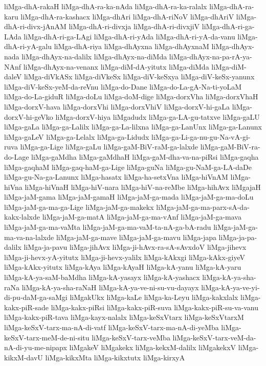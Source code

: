 {liMga-dhA-rakaH
liMga-dhA-ra-ka-nAda
liMga-dhA-ra-ka-ralalx
liMga-dhA-ra-karu
liMga-dhA-ra-kashacx
liMga-dhAri
liMga-dhA-riNoV
liMga-dhAriV
liMga-dhA-ri-divx-jAnAM
liMga-dhA-ri-divxja
liMga-dhA-ri-divxjiV
liMga-dhA-ri-ga-LAda
liMga-dhA-ri-ga-LAgi
liMga-dhA-ri-yAda
liMga-dhA-ri-yA-da-vanu
liMga-dhA-ri-yA-galu
liMga-dhA-riya
liMga-dhAyxna
liMga-dhAyxnaM
liMga-dhAyx-nada
liMga-dhAyx-na-dalilx
liMga-dhAyx-na-diMda
liMga-dhAyx-na-pa-rA-ya-NAnf
liMga-dhAyx-na-venanx
liMga-diM-dA-yitutx
liMga-diMda
liMga-diM-daleV
liMga-diVkASx
liMga-diVkeSx
liMga-diV-keSxya
liMga-diV-keSx-yanunx
liMga-diV-keSx-yeM-da-reVnu
liMga-do-Dane
liMga-do-La-gA-Na-ti-yoLaM
liMga-do-La-giduR
liMga-doLu
liMga-doM-dige
liMga-dorxVha
liMga-dorxVhaH
liMga-dorxV-hava
liMga-dorxVhi
liMga-dorxVhiV
liMga-dorxV-hi-gaLa
liMga-dorxV-hi-geVko
liMga-dorxV-hiya
liMgadudx
liMga-ga-LA-gu-tatxve
liMga-gaLU
liMga-gaLa
liMga-ga-Lalilx
liMga-ga-La-lilxna
liMga-ga-LanUnx
liMga-ga-Lanunx
liMga-gaLeV
liMga-ga-Lelalx
liMga-ga-Lidudx
liMga-ga-Li-ga-nu-gu-Na-vA-gi-ruva
liMga-ga-Lige
liMga-gaLu
liMga-gaM-BiV-raM-ga-lalxde
liMga-gaM-BiV-ra-do-Lage
liMga-gaMdha
liMga-gaMdhaH
liMga-gaM-dha-va-na-piRsi
liMga-gaqha
liMga-gaqhaM
liMga-gaq-haM-ga-Lige
liMga-guNa
liMga-gu-NaM-ga-LA-daDe
liMga-gu-Na-ga-Lanunx
liMga-hasatx
liMga-ha-setxVna
liMga-hiVnAM
liMga-hiVna
liMga-hiVnaH
liMga-hiV-nara
liMga-hiV-na-reMbe
liMga-hihAvx
liMgajaH
liMga-jaM-gama
liMga-jaM-gamaH
liMga-jaM-ga-mada
liMga-jaM-ga-ma-doLu
liMga-jaM-ga-ma-ga-Lige
liMga-jaM-ga-makekx
liMga-jaM-ga-ma-parx-sA-da-kakx-lalxde
liMga-jaM-ga-matA
liMga-jaM-ga-ma-vAnf
liMga-jaM-ga-mava
liMga-jaM-ga-ma-vaMta
liMga-jaM-ga-ma-vaM-ta-nA-ga-bA-radu
liMga-jaM-ga-ma-va-na-lalxde
liMga-jaM-ga-mave
liMga-jaM-ga-mavu
liMga-japa
liMga-ja-pa-dalilx
liMga-ja-pavu
liMga-jihAvx
liMga-ji-hAvx-ra-sA-sAvxdoV
liMga-jihevx
liMga-ji-hevx-yA-yitutx
liMga-ji-hevx-yalilx
liMga-kAkxgi
liMga-kAkx-giyeV
liMga-kAkx-yitutx
liMga-kAya
liMga-kAyaH
liMga-kA-yanu
liMga-kA-yaru
liMga-kA-ya-saM-baMdha
liMga-kA-yasayx
liMga-kA-yashacx
liMga-kA-ya-sha-raNa
liMga-kA-ya-sha-raNaH
liMga-kA-ya-ve-ni-su-vu-dayayx
liMga-kA-ya-ve-yi-di-pu-daM-ga-saMgi
liMgakUkx
liMga-kaLe
liMga-ka-Leyu
liMga-kakxlalx
liMga-kakx-piR-sade
liMga-kakx-piRsi
liMga-kakx-piR-suva
liMga-kakx-piR-su-va-vanu
liMga-kakx-piR-tava
liMga-kayx-nalalx
liMga-keSxVtarx
liMga-keSxVtarxM
liMga-keSxV-tarx-ma-nA-di-vatf
liMga-keSxV-tarx-ma-nA-di-yeMba
liMga-keSxV-tarx-meM-de-ni-situ
liMga-keSxV-tarx-veMba
liMga-keSxV-tarx-veM-da-nA-di-yu-me-nipapx
liMgakeV
liMgakekx
liMga-kekxM-dalilx
liMgakekxV
liMga-kikxM-davU
liMga-kikxMta
liMga-kikxtutx
liMga-kirxyA
}
